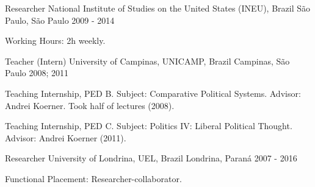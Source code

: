 \begin{cventries}
\cventry
{Researcher}
{National Institute of Studies on the United States (INEU), Brazil}
{São Paulo, São Paulo}
{2009 - 2014}
{
\begin{cvitems}
  \item Working Hours: 2h weekly.
\end{cvitems}
}

\cventry
{Teacher (Intern)}
{University of Campinas, UNICAMP, Brazil}
{Campinas, São Paulo}
{2008; 2011}
{
\begin{cvitems}
  \item Teaching Internship, PED B. Subject: Comparative Political Systems. Advisor: Andrei Koerner. Took half of lectures (2008).
  \item Teaching Internship, PED C. Subject: Politics IV: Liberal Political Thought. Advisor: Andrei Koerner (2011).
\end{cvitems}
}

\cventry
{Researcher}
{University of Londrina, UEL, Brazil}
{Londrina, Paraná}
{2007 - 2016}
{
\begin{cvitems}
  \item Functional Placement: Researcher-collaborator.
\end{cvitems}
}

\end{cventries}
